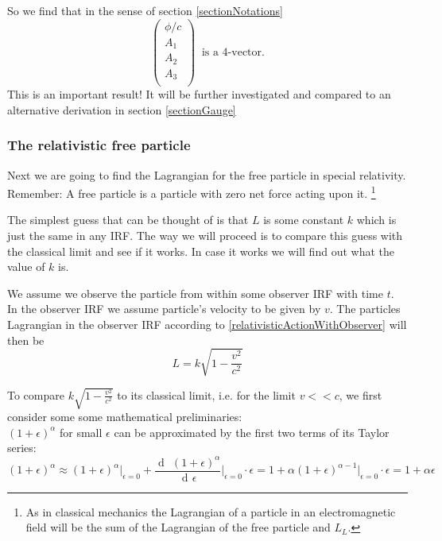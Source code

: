 \documentclass{article}
\DeclareMathOperator{\dd}{d\!}
\begin{document}
So we find that in the sense of section \ref{sectionNotations}
\begin{equation} \label{vectorPotentialsAreA4Vector}
    \left(\begin{array}{c}
              \phi / c \\
              A_1\\
              A_2\\
              A_3\\
    \end{array} \right)
  \;\; \text{is a 4-vector.}
\end{equation}
This is an important result!
It will be further investigated and compared to an alternative derivation in section \ref{sectionGauge}



\subsubsection{The relativistic free particle} \label{sectionRelativisticFreeParticle}
Next we are going to find the Lagrangian for the free particle in special relativity.
Remember: A free particle is a particle with zero net force acting upon it.
\footnote{As in classical mechanics the Lagrangian of a particle in an electromagnetic field will be the sum of the Lagrangian of the free particle and $L_L$.}

The simplest guess that can be thought of is that $L$ is some constant $k$ which is just the same in any IRF.
The way we will proceed is to compare this guess with the classical limit and see if it works.
In case it works we will find out what the value of $k$ is.

We assume we observe the particle from within some observer IRF with time $t$.
In the observer IRF we assume particle's velocity to be given by $v$.
The particles Lagrangian in the observer IRF according to \ref{relativisticActionWithObserver} will then be
\begin{equation}
    L = k \sqrt{1-\frac{v^2}{c^2}}
\end{equation}

To compare $k \sqrt{1 - \frac{v^2}{c^2}}$ to its classical limit, i.e. for the limit $v << c$, we first consider some some mathematical preliminaries:\\

$(1+\epsilon)^\alpha$ for small $\epsilon$ can be approximated by the first two terms of its Taylor series:
\begin{equation}
    (1+\epsilon)^\alpha
    \approx (1+\epsilon)^\alpha \Big|_{\epsilon = 0}
    + \frac{\dd \; (1+\epsilon)^\alpha}{\dd \epsilon}\Big|_{\epsilon = 0} \cdot \epsilon
    = 1 + \alpha (1+\epsilon)^{\alpha -1} \Big|_{\epsilon = 0} \cdot \epsilon
    = 1 + \alpha \epsilon
\end{equation}
\end{document}

